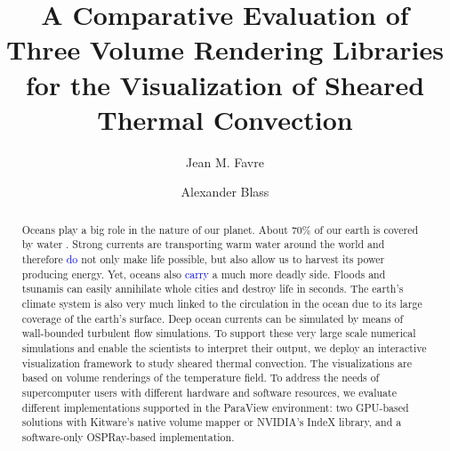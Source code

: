 \documentclass[5p,times]{elsarticle}
\begin{document}
\begin{frontmatter}



\title{A Comparative Evaluation of Three Volume Rendering Libraries for the Visualization of Sheared Thermal Convection}


\author[CSCS]{Jean M. Favre}


\author[Twente]{Alexander Blass}

\address[CSCS]{Swiss National Supercomputing Center (CSCS), Via Trevano 131, CH-6900 Lugano, Switzerland}
\address[Twente]{Physics of Fluids Group, Max Planck Center for Complex Fluid Dynamics,
J. M. Burgers Center for Fluid Dynamics and MESA+ Research Institute,
Department of Science and Technology,
University of Twente, P.O. Box 217, 7500 AE Enschede, The Netherlands}



\begin{abstract}
Oceans play a big role in the nature of our planet. About $ 70 \% $ of our earth
is covered by water \cite{int14}. Strong currents are transporting warm water around the world
and therefore \textcolor{blue}{do} not only make life possible, but also allow us to harvest its
power producing energy. Yet, oceans also
\textcolor{blue}{carry} a much more deadly side. Floods and tsunamis can easily annihilate whole
cities and destroy life in seconds. The earth's climate system is also very much
linked to the circulation in the ocean due to its large coverage of the earth's surface.
Deep ocean currents can be simulated by means of wall-bounded turbulent flow simulations.
To support these very large scale numerical simulations and enable the scientists to interpret their output,
we deploy an interactive visualization framework to study sheared thermal convection.
The visualizations are based on volume renderings of the temperature field.
To address the needs of supercomputer users with different hardware and software resources,
we evaluate different implementations supported in the ParaView \cite{Ahrens2005} environment:
two GPU-based solutions with Kitware's native volume mapper or NVIDIA's IndeX library,
and a software-only OSPRay-based implementation.


\end{abstract}
\end{frontmatter}
\end{document}
